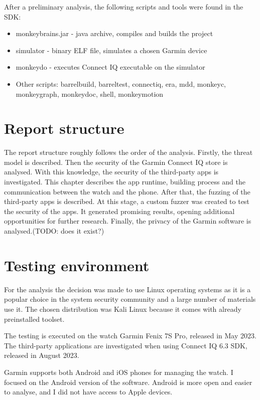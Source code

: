 After a preliminary analysis, the following scripts and tools were found in the SDK:

\begin{itemize}
    \item monkeybrains.jar - java archive, compiles and builds the project
    \item simulator - binary ELF file, simulates a chosen Garmin device
    \item monkeydo - executes Connect IQ executable on the simulator
    \item Other scripts: barrelbuild, barreltest, connectiq, era, mdd, monkeyc, monkeygraph, monkeydoc, shell, monkeymotion
\end{itemize}

\section{Report structure}
The report structure roughly follows the order of the analysis.
Firstly, the threat model is described.
Then the security of the Garmin Connect IQ store is analysed.
With this knowledge, the security of the third-party apps is investigated.
This chapter describes the app runtime, building process and the communication between the watch and the phone.
After that, the fuzzing of the third-party apps is described.
At this stage, a custom fuzzer was created to test the security of the apps.
It generated promising results, opening additional opportunities for further research.
Finally, the privacy of the Garmin software is analysed.(TODO: does it exist?)

\section{Testing environment}
For the analysis the decision was made to use Linux operating systems as it is a popular choice in the system security community and a large number of materials use it.
The chosen distribution was Kali Linux because it comes with already preinstalled toolset.

The testing is executed on the watch Garmin Fenix 7S Pro, released in May 2023.
The third-party applications are investigated when using Connect IQ 6.3 SDK, released in August 2023.

Garmin supports both Android and iOS phones for managing the watch.
I focused on the Android version of the software.
Android is more open and easier to analyse, and I did not have access to Apple devices.


